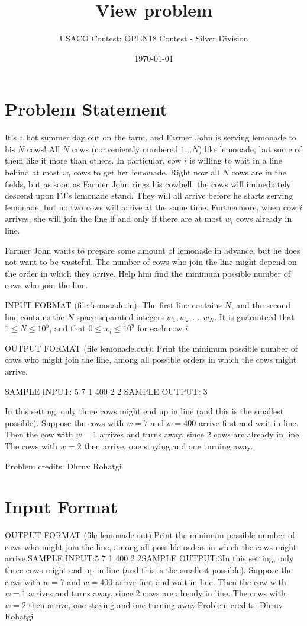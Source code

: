 \documentclass[12pt]{article}
\title{View problem}
\author{USACO Contest: OPEN18 Contest - Silver Division}
\date{\today}
\begin{document}
\maketitle

\section*{Problem Statement}

It's a hot summer day out on the farm, and Farmer John is serving lemonade to
his $N$ cows! All $N$ cows (conveniently numbered $1 \dots N$) like lemonade,
but some of them like it more than others. In particular, cow $i$ is willing to
wait in a line behind at most $w_i$ cows to get her lemonade. Right now all $N$
cows are in the fields, but as soon as Farmer John rings his cowbell, the cows
will immediately descend upon FJ's lemonade stand. They will all arrive before
he starts serving lemonade, but no two cows will arrive at the same time.
Furthermore, when cow $i$ arrives, she will join the line if and only if there
are at most $w_i$ cows already in line.

Farmer John wants to prepare some amount of lemonade in advance, but he does not
want to be wasteful. The number of cows who join the line might depend on the
order in which they arrive. Help him find the minimum possible number of cows
who join the line.

INPUT FORMAT (file lemonade.in):
The first line contains $N$, and the second line contains the $N$
space-separated integers $w_1, w_2, \dots, w_N$.  It is guaranteed that
$1 \leq N \leq 10^5$, and that $0 \leq w_i \leq 10^9$ for each cow $i$.

OUTPUT FORMAT (file lemonade.out):
Print the minimum possible number of cows who might join the line, among all
possible orders in which the cows might arrive.

SAMPLE INPUT:
5
7 1 400 2 2
SAMPLE OUTPUT: 
3

In this setting, only three cows might end up in line (and this is the smallest
possible).  Suppose the cows with $w = 7$ and $w = 400$ arrive first and wait in
line.  Then the cow with $w = 1$ arrives and turns away, since 2 cows are already
in line.  The cows with $w = 2$ then arrive, one staying and one turning away.

Problem credits: Dhruv Rohatgi



\section*{Input Format}
OUTPUT FORMAT (file lemonade.out):Print the minimum possible number of cows who might join the line, among all
possible orders in which the cows might arrive.SAMPLE INPUT:5
7 1 400 2 2SAMPLE OUTPUT:3In this setting, only three cows might end up in line (and this is the smallest
possible).  Suppose the cows with $w = 7$ and $w = 400$ arrive first and wait in
line.  Then the cow with $w = 1$ arrives and turns away, since 2 cows are already
in line.  The cows with $w = 2$ then arrive, one staying and one turning away.Problem credits: Dhruv Rohatgi
\end{document}
